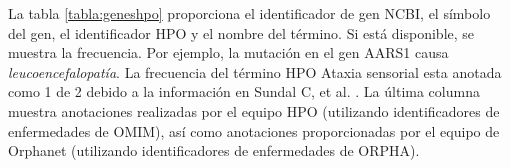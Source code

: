 La tabla \ref{tabla:geneshpo} proporciona el identificador de gen NCBI, el símbolo del gen, el identificador HPO y el nombre del término. Si está disponible, se muestra la frecuencia. Por ejemplo, la mutación en el gen AARS1 causa \textit{leucoencefalopatía}. La frecuencia del término HPO Ataxia sensorial esta anotada como 1 de 2 debido a la información en Sundal C, et al. \cite{Sundal2019}. La última columna muestra anotaciones realizadas por el equipo HPO (utilizando identificadores de enfermedades de OMIM), así como anotaciones proporcionadas por el equipo de Orphanet (utilizando identificadores de enfermedades de ORPHA).
